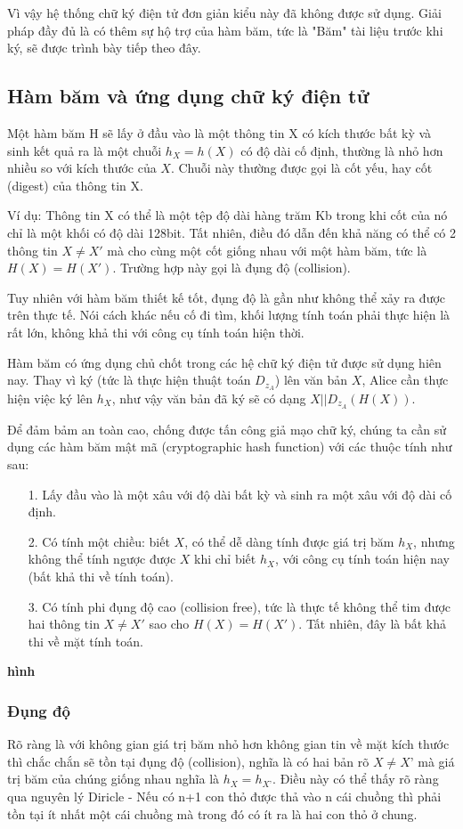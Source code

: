 \documentclass[a4paper,12pt]{report}
\begin{document}
Vì vậy hệ thống chữ ký điện tử đơn giản kiểu này đã không được sử dụng. Giải pháp đầy đủ là có thêm sự hộ trợ của hàm băm, tức là "Băm" tài liệu trước khi ký, sẽ được trình bày tiếp theo đây.
\subsection*{Hàm băm và ứng dụng chữ ký điện tử}
Một hàm băm H sẽ lấy ở đầu vào là một thông tin X có kích thước bất kỳ và sinh kết quả ra là một chuỗi $h_X=h(X)$ có độ dài cố định, thường là nhỏ hơn nhiều so với kích thước của $X$. Chuỗi này thường được gọi là cốt yếu, hay cốt (digest) của thông tin X.

Ví dụ: Thông tin X có thể là một tệp độ dài hàng trăm Kb trong khi cốt của nó chỉ là một khối có độ dài 128bit. Tất nhiên, điều đó dẫn đến khả năng có thể có 2 thông tin $X \neq X'$ mà cho cùng một cốt giống nhau với một hàm băm, tức là $H(X) = H(X')$. Trường hợp này gọi là đụng độ (collision).

Tuy nhiên với hàm băm thiết kế tốt, đụng độ là gần như không thể xảy ra được trên thực tế. Nói cách khác nếu cố đi tìm, khối lượng tính toán phải thực hiện là rất lớn, không khả thi với công cụ tính toán hiện thời.

Hàm băm có ứng dụng chủ chốt trong các hệ chữ ký điện tử được sử dụng hiên nay. Thay vì ký (tức là thực hiện thuật toán $D_{z_A}$) lên văn bản $X$, Alice cần thực hiện việc ký lên $h_X$, như vậy văn bản đã ký sẽ có dạng $X || D_{z_A}(H(X))$.

Để đảm bảm an toàn cao, chống được tấn công giả mạo chữ ký, chúng ta cần sử dụng các hàm băm mật mã (cryptographic hash function) với các thuộc tính như sau:
\begin{itemize}
\item[1. ] Lấy đầu vào là một xâu với độ dài bất kỳ và sinh ra một xâu với độ dài cố định.
\item[2. ] Có tính một chiều: biết $X$, có thể dễ dàng tính được giá trị băm $h_X$, nhưng không thể tính ngược được $X$ khi chỉ biết $h_X$, với công cụ tính toán hiện nay (bất khả thi về tính toán).
\item[3. ] Có tính phi đụng độ cao (collision free), tức là thực tế không thể tim được hai thông tin $X \neq X'$ sao cho $H(X) = H(X')$. Tất nhiên, đây là bất khả thi về mặt tính toán.
\end{itemize}

\textbf{hình}

\subsubsection{Đụng độ}
Rõ ràng là với không gian giá trị băm nhỏ hơn không gian tin về mặt kích thước thì chắc chắn sẽ tồn tại đụng độ (collision), nghĩa là có hai bản rõ $X \neq X’$ mà giá trị băm của chúng giống nhau nghĩa là $h_X=h_{X’}$. Điều này có thể thấy rõ ràng qua nguyên lý Diricle - Nếu có n+1 con thỏ được thả vào n cái chuồng thì phải tồn tại ít nhất một cái chuồng mà trong đó có ít ra là hai con thỏ ở chung.
\end{document}
